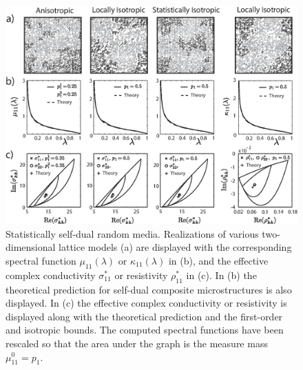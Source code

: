 \documentclass{cmslatex}
\begin{document}
%
%
\begin{figure}[t]
  \centerline{\includegraphics[scale=0.7]{A_Duality_RRN_11.eps}}
\caption{Statistically self-dual random media. Realizations of various 
  two-dimensional lattice models (a) are displayed with
  the corresponding spectral function $\mu_{11}(\lambda)$ or $\kappa_{11}(\lambda)$ in
  (b), and the effective complex conductivity $\sigma^*_{11}$ or resistivity
  $\rho^*_{11}$ in (c). In (b) the theoretical prediction for self-dual
  composite microstructures is also displayed. In (c) the effective
  complex conductivity or resistivity is displayed along with the
  theoretical prediction and the first-order and isotropic bounds. The
  computed spectral functions have been rescaled so that the area
  under the graph is the measure mass $\mu^0_{11}=p_1$.                
        }
\label{fig:Duality_RRN_11}
\end{figure}
%
\end{document}
